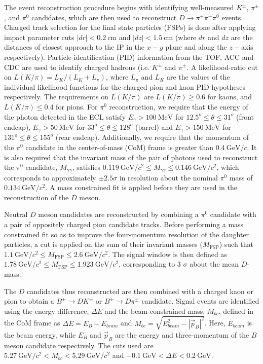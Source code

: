 \documentclass[aps,prl,twocolumn,superscriptaddress,showpacs,preprintnumbers,amsmath,amssymb]{revtex4}
\begin{document}
 The event reconstruction procedure begins with identifying well-measured $K^{\pm}$, $\pi^{\pm}$, and $\pi^0$ candidates, which are then used to reconstruct $D \rightarrow \pi^+ \pi^- \pi^0$ events. Charged track selection for the final state particles (FSPs) is done after applying impact parameter cuts $|dr| < 0.2 ~ \mathrm{cm}$ and $|dz| < 1.5 ~ \mathrm{cm}$ (where $dr$ and $dz$ are the distances of closest approach to the IP in the $x-y$ plane and along the $z-$axis respectively). Particle identification (PID) information from the TOF, ACC and CDC are used to identify charged hadrons (i.e. $K^{\pm}$ and $\pi^{\pm}$. A likelihood-ratio cut on $L(K/\pi) = L_K/(L_K + L_{\pi})$, where $L_{\pi}$ and $L_K$ are the values of the individual likelihood functions for the charged pion and kaon PID hypotheses respectively. The requirements on $L(K/\pi)$ are $L(K/\pi) \geq 0.6$ for kaons, and $L(K/\pi) \leq 0.4$ for pions. For $\pi^0$ reconstruction, we require that the energy of the photon detected in the ECL satisfy $E_{\gamma} > 100 ~ \mathrm{MeV}$ for $12.5^o \leq \theta \leq 31^o$ (front endcap), $E_{\gamma} > 50 ~ \mathrm{MeV}$ for $33^o \leq \theta \leq 128^o$ (barrel) and $E_{\gamma} > 150 ~ \mathrm{MeV}$ for $131^o \leq \theta \leq 155^o$ (rear endcap). Additionally, we require that the momentum of the $\pi^0$ candidate in the center-of-mass (CoM) frame is greater than $0.4~ \mathrm{GeV/}c$. It is also required that the invariant mass of the pair of photons used to reconstruct the $\pi^0$ candidate, $M_{\gamma \gamma}$, satisfies $0.119 ~ \mathrm{GeV/}c^2 \leq M_{\gamma \gamma} \leq 0.146 ~ \mathrm{GeV/}c^2$, which corresponds to approximately $\pm 2.5 \sigma$ in resolution about the nominal $\pi^{0}$ mass of $0.134 ~ \mathrm{GeV/}c^2$. A mass constrained fit is applied before they are used in the reconstruction of the $D$ meson.

Neutral $D$ meson candidates are reconstructed by combining a $\pi^0$ candidate with a pair of oppositely charged pion candidate tracks. Before performing a mass constrained fit so as to improve the four-momentum resolution of the daughter particles, a cut is applied on the sum of their invariant masses ($M_{\mathrm{FSP}}$) such that $1.1 ~ \mathrm{GeV/}c^2 \leq M_{\mathrm{FSP}} \leq 2.6 ~ \mathrm{GeV/}c^2$. The signal window is then defined as $1.78 ~ \mathrm{GeV/}c^2 \leq M_{\mathrm{FSP}} \leq 1.923 ~ \mathrm{GeV/}c^2$, corresponding to 3 $\sigma$ about the mean $D$-mass. 

The $D$ candidates thus reconstructed are then combined with a charged kaon or pion to obtain a $B^{\pm} \rightarrow DK^{\pm}$ or $B^{\pm} \rightarrow D\pi^{\pm}$ candidate. Signal events are identified using the energy difference, $\Delta E$ and the beam-constrained mass, $M_{bc}$, defined in the CoM frame as $\Delta E = E_B - E_{beam}$ and $M_{bc} = \sqrt{E^2_{beam}-|\vec{p}_B|^2}$. Here, $E_{beam}$ is the beam energy, while  $E_B$ and $\vec{p}_B$ are the energy and three-momentum of the $B$ meson candidate respectively. The cuts used are $5.27 ~ \mathrm{GeV/}c^{2} < M_{bc} < 5.29 ~ \mathrm{GeV/}c^2$ and $-0.1~ \mathrm{GeV} < \Delta E < 0.2 ~ \mathrm{GeV}$.
\end{document}
